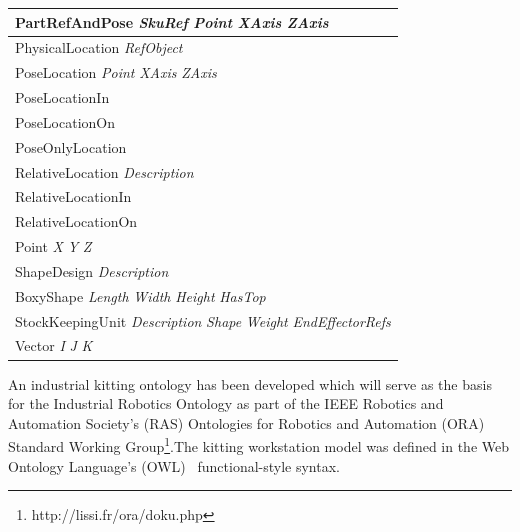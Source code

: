 \documentclass[preprint,12pt]{elsarticle}
\newcommand{\class}[1] {\textsf{#1}}
\begin{document}
\begin{table}[!h!t]
{\begin{tabular}{l}
\\\midrule
\hspace{5 mm}\class{PartRefAndPose} \textit{SkuRef} \textit{Point} \textit{XAxis} \textit{ZAxis}
\\\midrule
\hspace{5 mm}\class{PhysicalLocation} \textit{RefObject}
\\\midrule
\hspace{10 mm}\class{PoseLocation} \textit{Point} \textit{XAxis} \textit{ZAxis}
\\\midrule
\hspace{15 mm}\class{PoseLocationIn}
\\\midrule
\hspace{15 mm}\class{PoseLocationOn}
\\\midrule
\hspace{15 mm}\class{PoseOnlyLocation}
\\\midrule
\hspace{10 mm}\class{RelativeLocation} \textit{Description}
\\\midrule
\hspace{15 mm}\class{RelativeLocationIn}
\\\midrule
\hspace{15 mm}\class{RelativeLocationOn}
\\\midrule
\hspace{5 mm}\class{Point} \textit{X} \textit{Y} \textit{Z}
\\\midrule
\hspace{5 mm}\class{ShapeDesign} \textit{Description}
\\\midrule
\hspace{10 mm}\class{BoxyShape} \textit{Length} \textit{Width} \textit{Height} \textit{HasTop}
\\\midrule
\hspace{5 mm}\class{StockKeepingUnit} \textit{Description} \textit{Shape} \textit{Weight} \textit{EndEffectorRefs}
\\\midrule
\hspace{5 mm}\class{Vector} \textit{I} \textit{J} \textit{K}
\\\bottomrule
\end{tabular}
}
\end{table}

An industrial kitting ontology has been developed which will serve as the basis for the Industrial Robotics Ontology as part of the IEEE Robotics and Automation Society's (RAS) Ontologies for Robotics and Automation (ORA) Standard Working Group\footnote{http://lissi.fr/ora/doku.php}.The kitting workstation model was defined in the Web Ontology Language's (OWL)~\cite{OWLoverview} functional-style syntax.
\end{document}
